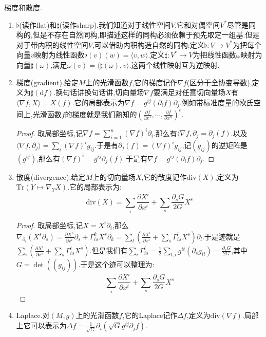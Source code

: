 梯度和散度.
\begin{enumerate}
	\item $\flat$(读作flat)和$\sharp$(读作sharp).我们知道对于线性空间$V$,它和对偶空间$V^*$尽管是同构的,但是不存在自然同构,即描述这样的同构必须依赖于预先取定一组基.但是对于带内积的线性空间$V$,可以借助内积构造自然的同构:定义$\flat:V\to V^*$为把每个向量$v$映射为线性函数$\flat(v)(w)=\langle v,w\rangle$.定义$\sharp:V^*\to V$为把线性函数$\omega$映射为向量$\sharp(\omega)$,满足$\omega(v)=\langle\sharp(\omega),v\rangle$.这两个线性映射互为逆映射.
	\item 梯度(gradient).给定$M$上的光滑函数$f$,它的梯度记作$\nabla f$(区分于全协变导数),定义为$\sharp(\mathrm{d}f)$.换句话讲换句话讲,切向量场$\nabla f$要满足对任意切向量场$X$有$\langle\nabla f,X\rangle=X(f)$.它的局部表示为$\nabla f=g^{ij}(\partial_if)\partial_j$.例如带标准度量的欧氏空间上,光滑函数$f$的梯度就是我们熟知的$\left(\frac{\partial f}{\partial x^1},\cdots,\frac{\partial f}{\partial x^n}\right)^t$.
	\begin{proof}
		
		取局部坐标,记$\nabla f=\sum_{i=1}^n(\nabla f)^i\partial_i$.那么有$\langle\nabla f,\partial_j=\partial_j(f)$.以及$\langle\nabla f,\partial_j\rangle=\sum_i(\nabla f)^ig_{ij}$.于是有$\partial_j(f)=(\nabla f)^ig_{ij}$,记$(g_{ij})$的逆矩阵是$(g^{ij})$,那么有$(\nabla f)^i=g^{ij}\partial_j(f)$.于是有$\nabla f=g^{ij}(\partial_if)\partial_j$.
	\end{proof}
	\item 散度(divergence).给定$M$上的切向量场$X$,它的散度记作$\mathrm{div}(X)$,定义为$\mathrm{Tr}(Y\mapsto\nabla_YX)$.它的局部表示为:
	$$\mathrm{div}(X)=\sum_i\frac{\partial X^i}{\partial x^i}+\sum_s\frac{\partial_sG}{2G}X^s$$
	\begin{proof}
		
		取局部坐标,记$X=X^i\partial_i$,那么$\nabla_{\partial_i}(X^s\partial_s)=\frac{\partial X^s}{\partial x^i}\partial_s+\Gamma_{is}^kX^s\partial_k=\sum_l\left(\frac{\partial X^l}{\partial x^i}+\sum_s\Gamma_{is}^lX^s\right)\partial_l$.于是迹就是$\sum_i\left(\frac{\partial X^i}{\partial x^i}+\sum_s\Gamma_{is}^iX^s\right)$.但是我们有$\sum_i\Gamma_{is}^i=\frac{1}{2}\sum_{t,i}g^{it}(\partial_sg_{it})=\frac{\partial_sG}{2G}$,其中$G=\det((g_{ij}))$.于是这个迹可以整理为:
		$$\sum_i\frac{\partial X^i}{\partial x^i}+\sum_s\frac{\partial_sG}{2G}X^s$$
	\end{proof}
	\item Laplace.对$(M,g)$上的光滑函数$f$,它的Laplace记作$\Delta f$,定义为$\mathrm{div}(\nabla f)$.局部上它可以表示为$\Delta f=\frac{1}{\sqrt{G}}\partial_i\left(\sqrt{G}g^{ij}\partial_jf\right)$.
\end{enumerate}
\newpage
